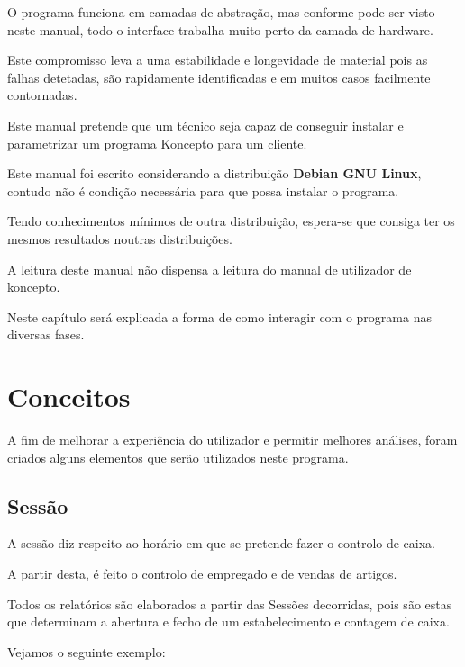 \documentclass[a4paper,11pt,openany]{memoir}
\begin{document}
O programa funciona em camadas de abstração, mas conforme pode ser visto neste manual, todo o interface trabalha muito perto da camada de hardware.

Este compromisso leva a uma estabilidade e longevidade de material pois as falhas detetadas, são rapidamente identificadas e em muitos casos facilmente contornadas.

Este manual pretende que um técnico seja capaz de conseguir instalar e parametrizar um programa Koncepto para um cliente.

Este manual foi escrito considerando a distribuição \textbf{Debian GNU Linux}, contudo não é condição necessária para que possa instalar o programa.

Tendo conhecimentos mínimos de outra distribuição, espera-se que consiga ter os mesmos resultados noutras distribuições. 

A leitura deste manual não dispensa a leitura do manual de utilizador de koncepto.


Neste capítulo será explicada a forma de como interagir com o programa nas diversas fases.



\newpage
\section{Conceitos}

A fim de melhorar a experiência do utilizador e permitir melhores análises, foram criados alguns elementos 
que serão utilizados neste programa.

\subsection{Sessão}

A sessão diz respeito ao horário em que se pretende fazer o controlo de caixa.

A partir desta, é feito o controlo de empregado e de vendas de artigos. 

Todos os relatórios são elaborados a partir das Sessões decorridas, pois são estas 
que determinam a abertura e fecho de um estabelecimento e contagem de caixa.

Vejamos o seguinte exemplo:
\end{document}
